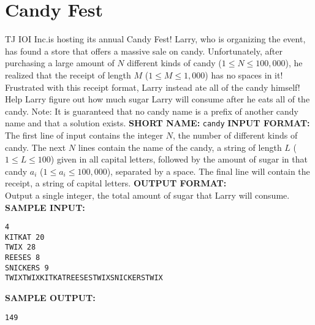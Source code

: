 \section{Candy Fest}

TJ IOI Inc.\@ is hosting its annual Candy Fest! Larry, who is organizing the event, has found a store that offers a massive sale on candy. Unfortunately, after purchasing a large amount of $ N $ different kinds of candy ($ 1 \leq N \leq 100,000 $), he realized that the receipt of length $ M $ ($ 1 \leq M \leq 1,000 $) has no spaces in it! Frustrated with this receipt format, Larry instead ate all of the candy himself! Help Larry figure out how much sugar Larry will consume after he eats all of the candy.
\blank
Note: It is guaranteed that no candy name is a prefix of another candy name and that a solution exists.
\blank
\textbf{SHORT NAME:} \verb|candy|
\blank
\textbf{INPUT FORMAT:}\\
The first line of input contains the integer $ N $, the number of different kinds of candy.  The next $ N $ lines contain the name of the candy, a string of length $ L $ ($ 1 \leq L \leq 100 $) given in all capital letters, followed by the amount of sugar in that candy $a_i$ ($1 \leq a_i \leq 100,000$), separated by a space.  The final line will contain the receipt, a string of capital letters.
\blank
\textbf{OUTPUT FORMAT:}\\
Output a single integer, the total amount of sugar that Larry will consume.
\blank
\textbf{SAMPLE INPUT:}
\begin{verbatim}
4
KITKAT 20
TWIX 28
REESES 8
SNICKERS 9
TWIXTWIXKITKATREESESTWIXSNICKERSTWIX
\end{verbatim}
\textbf{SAMPLE OUTPUT:}
\begin{verbatim}
149
\end{verbatim}
